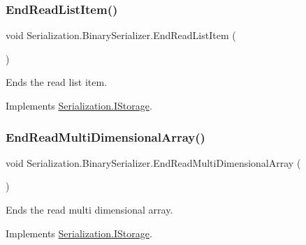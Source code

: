 \subsubsection{\texorpdfstring{End\+Read\+List\+Item()}{EndReadListItem()}}
{\footnotesize\ttfamily void Serialization.\+Binary\+Serializer.\+End\+Read\+List\+Item (\begin{DoxyParamCaption}{ }\end{DoxyParamCaption})\hspace{0.3cm}{\ttfamily [inline]}}



Ends the read list item. 



Implements \hyperlink{interface_serialization_1_1_i_storage_a8308151ce64440db9ac2c385e3b96d45}{Serialization.\+I\+Storage}.

\mbox{\label{class_serialization_1_1_binary_serializer_a174c1b111506dcf2be86461ab54b00bc}} 
\subsubsection{\texorpdfstring{End\+Read\+Multi\+Dimensional\+Array()}{EndReadMultiDimensionalArray()}}
{\footnotesize\ttfamily void Serialization.\+Binary\+Serializer.\+End\+Read\+Multi\+Dimensional\+Array (\begin{DoxyParamCaption}{ }\end{DoxyParamCaption})\hspace{0.3cm}{\ttfamily [inline]}}



Ends the read multi dimensional array. 



Implements \hyperlink{interface_serialization_1_1_i_storage_a449e4d99ff1a5e1a792e22955fb13018}{Serialization.\+I\+Storage}.

\mbox{\label{class_serialization_1_1_binary_serializer_aa58ba842b871ad7030d126215a85c8cc}} 
